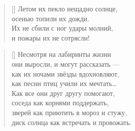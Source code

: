 \documentclass[a5paper,11pt]{memoir}
\begin{document}
\BgThispage





\begin{verse}[\versewidth]
	Летом их пекло нещадно солнце,\\
	осенью топили их дожди.\\
	Их не сбили с ног удары молний,\\
	и пожары их не сотрясли!
\end{verse}
\newpage

\begin{verse}[\versewidth]
	Несмотря на лабиринты жизни\\
	они выросли, и могут рассказать ---\\ 
	как их ночами звёзды вдохновляют,\\
	как песни птиц учили их мечтать\ldots\\
	Как все они друг другу помогают,\\
	соседа как корнями поддержать,\\
	зверей как приютить в мороз и стужу,\\
	диск солнца как встречать и провожать.
\end{verse}
\end{document}
